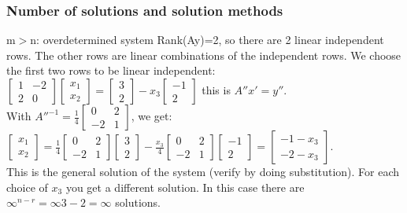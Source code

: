 \begin{frame}
	\frametitle{Number of solutions and solution methods}
	\begin{block}{m$>$n: overdetermined system}
		Rank(Ay)=2, so there are 2 linear independent rows. The other rows are linear combinations of the independent rows. We choose the first two rows to be linear independent:\\
		$\begin{bmatrix}
		1 & -2\\
		2 & 0 
		\end{bmatrix}\begin{bmatrix}
		x_1\\x_2
		\end{bmatrix}=\begin{bmatrix}
		3\\2
		\end{bmatrix}-x_3\begin{bmatrix}
		-1\\2
		\end{bmatrix}$ this is $A''x'=y''$. \\
		With $A''^{-1}=\frac{1}{4}\begin{bmatrix}
		0 & 2\\-2 & 1
		\end{bmatrix}$, we get:\\
		$\begin{bmatrix}
			x_1\\x_2
		\end{bmatrix}=\frac{1}{4}\begin{bmatrix}
		0 & 2\\-2 & 1
		\end{bmatrix}\begin{bmatrix}
		3\\2
		\end{bmatrix}-\frac{x_3}{4}\begin{bmatrix}
		0 & 2\\-2 & 1
		\end{bmatrix}\begin{bmatrix}
		-1\\2
		\end{bmatrix}=\begin{bmatrix}
		-1-x_3\\-2-x_3
		\end{bmatrix}$.\\
		This is the general solution of the system (verify by doing substitution). For each choice of $x_3$ you get a different solution. In this case there are $\infty^{n-r}=\infty{3-2}=\infty$ solutions.
	\end{block}
\end{frame}

